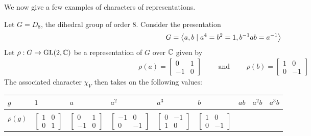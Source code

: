 We now give a few examples of characters of representations.

\begin{boxexample}
    Let $G = D_8$, the dihedral group of order $8$. Consider the presentation
    \begin{align*}
        G = \left\langle a, b \mid a^4 = b^2 = 1, b^{-1} a b = a^{-1} \right\rangle
    \end{align*}
    Let $\rho : G \to \operatorname{GL}\!\left( 2, \mathbb{C} \right)$ be a representation of $G$ over $\mathbb{C}$ given by
    \begin{align*}
        \rho(a) = \begin{bmatrix}
            0 & 1 \\ -1 & 0
        \end{bmatrix}
        \quad\quad \text{ and } \quad\quad
        \rho(b) = \begin{bmatrix}
            1 & 0 \\ 0 & -1
        \end{bmatrix}
    \end{align*}
    The associated character $\chi_V$ then takes on the following values:
    \begin{table}[H]
        \centering
        \hspace{-0.3cm}
        \begin{tabular}{C{1.1cm}|C{1.1cm} C{1.38cm} C{1.67cm} C{1.38cm} C{1.38cm} C{1.67cm} C{1.38cm} C{1.1cm}}
            $g$ & $1$ & $a$ & $a^2$ & $a^3$ & $b$ & $ab$ & $a^2 b$ & $a^3 b$ \\
            \hline \\[-11pt]
            $\rho(g)$ & \footnotesize 
            $\begin{bmatrix} 1 & 0 \\ 0 & 1 \end{bmatrix}$
            & \footnotesize
            $\begin{bmatrix} 0 & 1 \\ -1 & 0 \end{bmatrix}$
            & \footnotesize
            $\begin{bmatrix} -1 & 0 \\ 0 & -1 \end{bmatrix}$
            & \footnotesize
            $\begin{bmatrix} 0 & -1 \\ 1 & 0 \end{bmatrix}$
            & \footnotesize
            $\begin{bmatrix} 1 & 0 \\ 0 & -1 \end{bmatrix}$

\end{tabular}
\end{table}
\end{boxexample}
